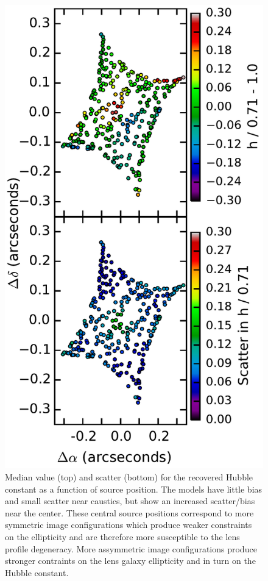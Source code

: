 \documentclass{emulateapj}
\begin{document}
\begin{figure}
\begin{center}
\includegraphics[width=1\columnwidth]{h_src_pos.pdf}
\caption{\label{fig:srcpos}
Median value (top) and scatter (bottom) for the recovered Hubble constant as a function of source position. The models have little bias and small scatter near caustics, but show an increased scatter/bias near the center. These central source positions correspond to more symmetric image configurations which produce weaker constraints on the ellipticity and are therefore more susceptible to the lens profile degeneracy. More assymmetric image configurations produce stronger contraints on the lens galaxy ellipticity and in turn on the Hubble constant.
}
\end{center}
\end{figure}
\end{document}
